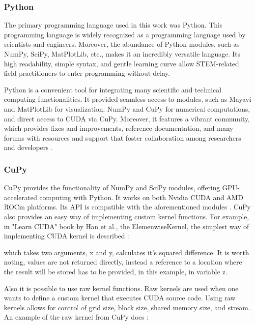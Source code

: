 \subsubsection{Python}

The primary programming language used in this work was Python. This programming language is widely recognized as a programming language used by scientists and engineers. Moreover, the abundance of Python modules, such as NumPy, SciPy, MatPlotLib, etc., makes it an incredibly versatile language. Its high readability, simple syntax, and gentle learning curve allow STEM-related field practitioners to enter programming without delay.

Python is a convenient tool for integrating many scientific and technical computing functionalities. It provided seamless access to modules, such as Mayavi and MatPlotLib for visualization, NumPy and CuPy for numerical computations, and direct access to CUDA via CuPy. Moreover, it features a vibrant community, which provides fixes and improvements, reference documentation, and many forums with resources and support that foster collaboration among researchers and developers \cite{python}.

\subsubsection{CuPy}

CuPy provides the functionality of NumPy and SciPy modules, offering GPU-accelerated computing with Python. It works on both Nvidia CUDA and AMD ROCm platforms. Its API is compatible with the aforementioned modules \cite{cupy_overview}. CuPy also provides an easy way of implementing custom kernel functions. For example, in "Learn CUDA" book by Han et al., the ElemenwiseKernel, the simplest way of implementing CUDA kernel is described \cite{learn_cuda}:

\vspace{0.2cm}

which takes two arguments, x and y, calculates it's squared difference. It is worth noting, values are not returned directly, instead a reference to a location where the result will be stored has to be provided, in this example, in variable z.

Also it is possible to use raw kernel functions. Raw kernels are used when one wants to define a custom kernel that executes CUDA source code. Using raw kernels allows for control of grid size, block size, shared memory size, and stream. An example of the raw kernel from CuPy docs \cite{cupy_raw_kernel}:

